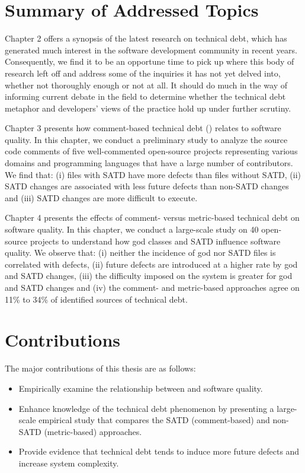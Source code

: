 
\section{Summary of Addressed Topics}


Chapter 2 offers a synopsis of the latest research on technical debt, which has generated much interest in the software development community in recent years. Consequently, we find it to be an opportune time to pick up where this body of research left off and address some of the inquiries it has not yet delved into, whether not thoroughly enough or not at all. It should do much in the way of informing current debate in the field to determine whether the technical debt metaphor and developers' views of the practice hold up under further scrutiny.

Chapter 3 presents how comment-based technical debt (\SATD) relates to software quality. In this chapter, we conduct a preliminary study to analyze the source code comments of five well-commented open-source projects representing various domains and programming languages that have a large number of contributors. We find that: (i) files with SATD have more defects than files without SATD, (ii) SATD changes are associated with less future defects than non-SATD changes and (iii) SATD changes are more difficult to execute.

Chapter 4 presents the effects of comment- versus metric-based technical debt on software quality. In this chapter, we conduct a large-scale study on 40 open-source projects to understand how god classes and SATD influence software quality. We observe that: (i) neither the incidence of god nor SATD files is correlated with defects, (ii) future defects are introduced at a higher rate by god and SATD changes, (iii) the difficulty imposed on the system is greater for god and SATD changes and (iv) the comment- and metric-based approaches agree on 11\% to 34\% of identified sources of technical debt.

\section{Contributions}
The major contributions of this thesis are as follows:

\begin{itemize}
	\item Empirically examine the relationship between \SATD and software quality.
	\item Enhance knowledge of the technical debt phenomenon by presenting a large-scale empirical study that compares the SATD (comment-based) and non-SATD (metric-based) approaches.
	\item Provide evidence that technical debt tends to induce more future defects and increase system complexity.
\end{itemize}

